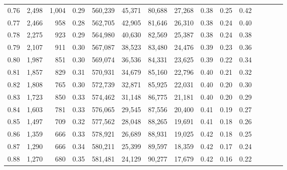 \begin{tabular}{rrrcrrrrrrrrrrr}
0.76 &   2,498 &   1,004 &                                       0.29 &  560,239 &   45,371 &   80,688 &   27,268 &  0.38 &  0.25 &                         0.42 \\
0.77 &   2,466 &     958 &                                       0.28 &  562,705 &   42,905 &   81,646 &   26,310 &  0.38 &  0.24 &                         0.40 \\
0.78 &   2,275 &     923 &                                       0.29 &  564,980 &   40,630 &   82,569 &   25,387 &  0.38 &  0.24 &                         0.38 \\
0.79 &   2,107 &     911 &                                       0.30 &  567,087 &   38,523 &   83,480 &   24,476 &  0.39 &  0.23 &                         0.36 \\
0.80 &   1,987 &     851 &                                       0.30 &  569,074 &   36,536 &   84,331 &   23,625 &  0.39 &  0.22 &                         0.34 \\
0.81 &   1,857 &     829 &                                       0.31 &  570,931 &   34,679 &   85,160 &   22,796 &  0.40 &  0.21 &                         0.32 \\
0.82 &   1,808 &     765 &                                       0.30 &  572,739 &   32,871 &   85,925 &   22,031 &  0.40 &  0.20 &                         0.30 \\
0.83 &   1,723 &     850 &                                       0.33 &  574,462 &   31,148 &   86,775 &   21,181 &  0.40 &  0.20 &                         0.29 \\
0.84 &   1,603 &     781 &                                       0.33 &  576,065 &   29,545 &   87,556 &   20,400 &  0.41 &  0.19 &                         0.27 \\
0.85 &   1,497 &     709 &                                       0.32 &  577,562 &   28,048 &   88,265 &   19,691 &  0.41 &  0.18 &                         0.26 \\
0.86 &   1,359 &     666 &                                       0.33 &  578,921 &   26,689 &   88,931 &   19,025 &  0.42 &  0.18 &                         0.25 \\
0.87 &   1,290 &     666 &                                       0.34 &  580,211 &   25,399 &   89,597 &   18,359 &  0.42 &  0.17 &                         0.24 \\
0.88 &   1,270 &     680 &                                       0.35 &  581,481 &   24,129 &   90,277 &   17,679 &  0.42 &  0.16 &                         0.22 \\

\end{tabular}
